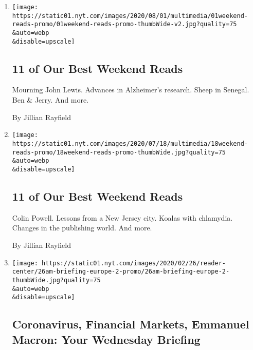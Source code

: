 \begin{enumerate}
\def\labelenumi{\arabic{enumi}.}
\item
  \href{/2020/07/31/briefing/11-of-our-best-weekend-reads.html}{}

  \texttt{[image: https://static01.nyt.com/images/2020/08/01/multimedia/01weekend-reads-promo/01weekend-reads-promo-thumbWide-v2.jpg?quality=75\\\&auto=webp\\\&disable=upscale]}

  \hypertarget{11-of-our-best-weekend-reads}{%
  \subsection{11 of Our Best Weekend
  Reads}\label{11-of-our-best-weekend-reads}}

  Mourning John Lewis. Advances in Alzheimer's research. Sheep in
  Senegal. Ben \& Jerry. And more.

  By Jillian Rayfield
\item
  \href{/2020/07/17/briefing/11-of-our-best-weekend-reads.html}{}

  \texttt{[image: https://static01.nyt.com/images/2020/07/18/multimedia/18weekend-reads-promo/18weekend-reads-promo-thumbWide.jpg?quality=75\\\&auto=webp\\\&disable=upscale]}

  \hypertarget{11-of-our-best-weekend-reads-1}{%
  \subsection{11 of Our Best Weekend
  Reads}\label{11-of-our-best-weekend-reads-1}}

  Colin Powell. Lessons from a New Jersey city. Koalas with chlamydia.
  Changes in the publishing world. And more.

  By Jillian Rayfield
\item
  \href{/2020/02/25/briefing/coronavirus-financial-markets-emmanuel-macron.html}{}

  \texttt{[image: https://static01.nyt.com/images/2020/02/26/reader-center/26am-briefing-europe-2-promo/26am-briefing-europe-2-thumbWide.jpg?quality=75\\\&auto=webp\\\&disable=upscale]}

  \hypertarget{coronavirus-financial-markets-emmanuel-macron-your-wednesday-briefing}{%
  \subsection{Coronavirus, Financial Markets, Emmanuel Macron: Your
  Wednesday
  Briefing}\label{coronavirus-financial-markets-emmanuel-macron-your-wednesday-briefing}}


\end{enumerate}
